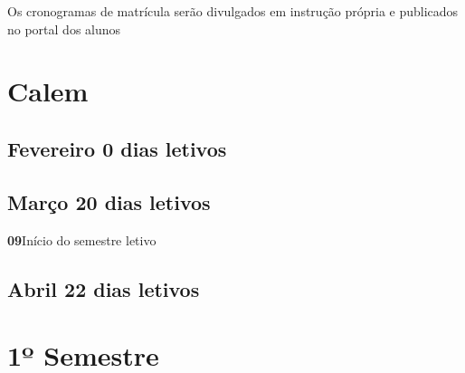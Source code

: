 \documentclass[thesis]{hmcposter}
\begin{document}
\begin{poster}
\begin{center}
\begin{table}
\centering
{}
\end{table}
\newline
\null
\newline
Os cronogramas de matrícula serão divulgados em instrução própria e publicados no portal dos alunos
\end{center}
\vfill
\null
\newpage\section{\color{hmcorange}Calem}\subsection{Fevereiro \hfill 0 dias letivos}\subsection{Março \hfill 20 dias letivos}\textbf{09}\qquad Início do semestre letivo \newline \null\subsection{Abril \hfill 22 dias letivos}\vfill\null
\columnbreak
\section{\hfill \color{hmcorange}1º Semestre}

\end{poster}
\end{document}
